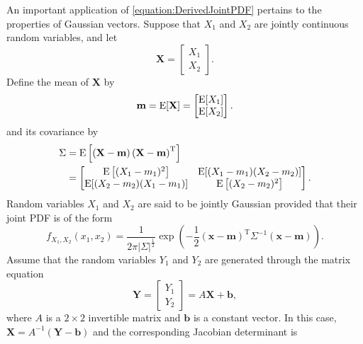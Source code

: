 \begin{example}
An important application of \eqref{equation:DerivedJointPDF} pertains to the properties of Gaussian vectors.
Suppose that $X_1$ and $X_2$ are jointly continuous random variables, and let
\begin{equation*}
\mathbf{X} = \begin{bmatrix} X_1 \\ X_2 \end{bmatrix} .
\end{equation*}
Define the mean of $\mathbf{X}$ by
\begin{equation*}
\mathbf{m} = \mathrm{E} [\mathbf{X}] 
= \begin{bmatrix} \mathrm{E}[ X_1 ] \\ \mathrm{E}[ X_2 ] \end{bmatrix} .
\end{equation*}
and its covariance by
\begin{equation*}
\begin{split}
\Sigma &= \mathrm{E} \left[ \left( \mathbf{X} - \mathbf{m} \right)
\left(\mathbf{X} - \mathbf{m} \right)^{\mathrm{T}} \right] \\
&= \begin{bmatrix} \mathrm{E} \left[ (X_1 - m_1)^2 \right] &
\mathrm{E}[ (X_1 - m_1) (X_2 - m_2) ]  \\
\mathrm{E}[ (X_2 - m_2) (X_1 - m_1) ] &
\mathrm{E} \left[ (X_2 - m_2)^2 \right] \end{bmatrix} .
\end{split}
\end{equation*}
Random variables $X_1$ and $X_2$ are said to be jointly Gaussian provided that their joint PDF is of the form
\begin{equation*}
f_{X_1, X_2} (x_1, x_2) = \frac{1}{2 \pi |\Sigma|^{\frac{1}{2}}}
\exp \left( - \frac{1}{2} \left( \mathbf{x} - \mathbf{m} \right)^{\mathrm{T}} \Sigma^{-1} \left( \mathbf{x} - \mathbf{m} \right) \right) .
\end{equation*}
Assume that the random variables $Y_1$ and $Y_2$ are generated through the matrix equation
\begin{equation*}
\mathbf{Y} = \begin{bmatrix} Y_1 \\ Y_2 \end{bmatrix}
= A \mathbf{X} + \mathbf{b} ,
\end{equation*}
where $A$ is a $2 \times 2$ invertible matrix and $\mathbf{b}$ is a constant vector.
In this case, $\mathbf{X} = A^{-1} \left( \mathbf{Y} - \mathbf{b} \right)$ and the corresponding Jacobian determinant is

\end{example}
